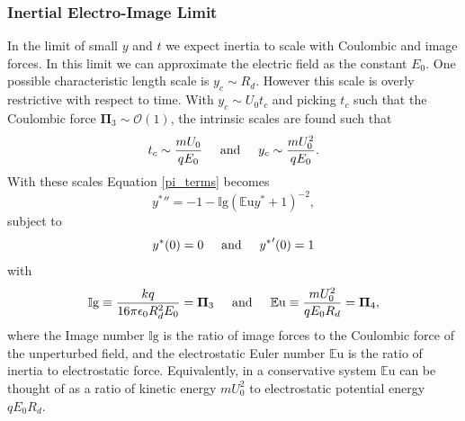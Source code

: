 \documentclass[aip,reprint, floatfix]{revtex4-1}
\begin{document}
\subsubsection{Inertial Electro-Image Limit}
In the limit of small $y$ and $t$ we expect inertia to scale with Coulombic and image forces. In this limit we can approximate the electric field as the constant $E_0$. One possible characteristic length scale is $y_c \sim R_d$. However this scale is overly restrictive with respect to time. With $y_c \sim U_0 t_c$ and picking $t_c$ such that the Coulombic force $\mathbf{\Pi}_3 \sim \mathcal{O}(1)$, the intrinsic scales are found such that
\[ t_c \sim \frac{m U_0}{q E_0} \hspace{5 mm} \mbox{and} \hspace{5 mm} 
y_c \sim \frac{m U_0^2}{q E_0} .
\]
With these scales Equation \ref{pi_terms} becomes
\begin{equation}
{y^*}'' = -1 - \mathbb{I}\mbox{g} \left( \mathbb{E}\mbox{u}{y^*} + 1 \right)^{-2} , \label{img_limit}
\end{equation}
subject to
\begin{equation*}
{y^*}(0) = 0 \hspace{5 mm} \mbox{and} \hspace{5 mm} {y^*}'(0) = 1
\end{equation*}
with 
\[ \mathbb{I}\mbox{g} \equiv \frac{k q}{16 \pi \epsilon_0 R_d^2 E_0} = \mathbf{\Pi}_3  \hspace{5 mm} \mbox{and} \hspace{5 mm}
\mathbb{E}\mbox{u} \equiv \frac{m U_0^2}{q E_0 R_d} = \mathbf{\Pi}_4 ,
\]
where the Image number $\mathbb{I}\mbox{g}$ is the ratio of image forces to the Coulombic force of the unperturbed field, and the electrostatic Euler number $\mathbb{E}\mbox{u}$ is the ratio of inertia to electrostatic force. Equivalently, in a conservative system $\mathbb{E}\mbox{u}$ can be thought of as a ratio of kinetic energy $m U_0^2$ to electrostatic potential energy $q E_0 R_d$.
\end{document}
